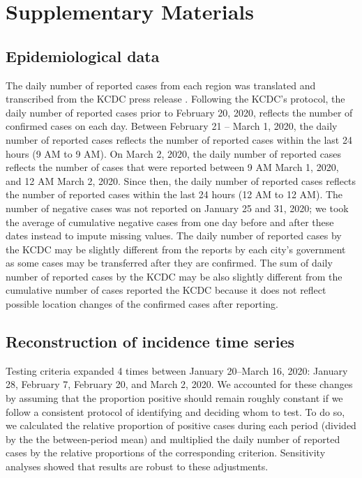 \renewcommand\thefigure{S\arabic{figure}}
\setcounter{figure}{0}    

\section*{Supplementary Materials}

\subsection*{Epidemiological data}

The daily number of reported cases from each region was translated and transcribed from the KCDC press release \citep{kcdc}.
Following the KCDC's protocol, the daily number of reported cases prior to February 20, 2020, reflects the number of confirmed cases on each day.
Between February 21 -- March 1, 2020, the daily number of reported cases reflects the number of reported cases within the last 24 hours (9 AM to 9 AM).
On March 2, 2020, the daily number of reported cases reflects the number of cases that were reported between 9 AM March 1, 2020, and 12 AM March 2, 2020.
Since then, the daily number of reported cases reflects the number of reported cases within the last 24 hours (12 AM to 12 AM).
The number of negative cases was not reported on January 25 and 31, 2020; we took the average of cumulative negative cases from one day before and after these dates instead to impute missing values.
The daily number of reported cases by the KCDC may be slightly different from the reports by each city's government as some cases may be transferred after they are confirmed.
The sum of daily number of reported cases by the KCDC may be also slightly different from the cumulative number of cases reported the KCDC because it does not reflect possible location changes of the confirmed cases after reporting.

\subsection*{Reconstruction of incidence time series}

Testing criteria expanded 4 times between January 20--March 16, 2020: January 28, February 7, February 20, and March 2, 2020.
We accounted for these changes by assuming that the proportion positive should remain roughly constant if we follow a consistent protocol of identifying and deciding whom to test.
To do so, we calculated the relative proportion of positive cases during each period (divided by the the between-period mean) and multiplied the daily number of reported cases by the relative proportions of the corresponding criterion.
Sensitivity analyses showed that results are robust to these adjustments.

